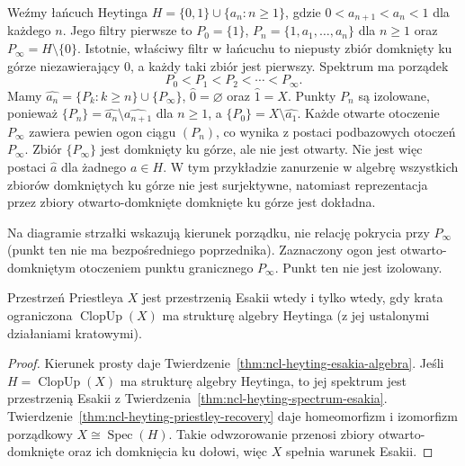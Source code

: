 \begin{przyklad}
\label{ex:ncl-heyting-infinite-spectrum}
Weźmy łańcuch Heytinga
$H=\{0,1\}\cup\{a_n:n\geq1\}$,
gdzie $0<a_{n+1}<a_n<1$ dla każdego $n$.
Jego filtry pierwsze to
$P_0=\{1\}$, $P_n=\{1,a_1,\ldots,a_n\}$ dla $n\geq1$
oraz $P_\infty=H\setminus\{0\}$.
Istotnie, właściwy filtr w łańcuchu to niepusty
zbiór domknięty ku górze niezawierający $0$,
a każdy taki zbiór jest pierwszy.
Spektrum ma porządek
\[
 P_0<P_1<P_2<\cdots<P_\infty.
\]
Mamy $\widehat{a_n}=\{P_k:k\geq n\}\cup\{P_\infty\}$,
$\widehat0=\varnothing$ oraz $\widehat1=X$.
Punkty $P_n$ są izolowane, ponieważ
$\{P_n\}=\widehat{a_n}\setminus\widehat{a_{n+1}}$
dla $n\geq1$, a $\{P_0\}=X\setminus\widehat{a_1}$.
Każde otwarte otoczenie $P_\infty$ zawiera
pewien ogon ciągu $(P_n)$, co wynika z postaci
podbazowych otoczeń $P_\infty$.
Zbiór $\{P_\infty\}$ jest domknięty ku górze,
ale nie jest otwarty. Nie jest więc postaci
$\widehat a$ dla żadnego $a\in H$.
W tym przykładzie zanurzenie w algebrę wszystkich
zbiorów domkniętych ku górze nie jest surjektywne,
natomiast reprezentacja przez zbiory
otwarto-domknięte domknięte ku górze jest dokładna.
\end{przyklad}

\begin{center}
\end{center}
Na diagramie strzałki wskazują kierunek porządku,
nie relację pokrycia przy $P_\infty$ (punkt ten
nie ma bezpośredniego poprzednika).
Zaznaczony ogon jest otwarto-domkniętym
otoczeniem punktu granicznego $P_\infty$.
Punkt ten nie jest izolowany.

\begin{wniosek}
\label{cor:ncl-heyting-esakia-characterization}
Przestrzeń Priestleya $X$ jest przestrzenią Esakii
wtedy i tylko wtedy, gdy krata ograniczona
$\operatorname{ClopUp}(X)$ ma strukturę algebry
Heytinga (z jej ustalonymi działaniami kratowymi).
\end{wniosek}
\begin{proof}
Kierunek prosty daje
Twierdzenie~\ref{thm:ncl-heyting-esakia-algebra}.
Jeśli $H=\operatorname{ClopUp}(X)$ ma strukturę
algebry Heytinga, to jej spektrum jest przestrzenią
Esakii z Twierdzenia~\ref{thm:ncl-heyting-spectrum-esakia}.
Twierdzenie~\ref{thm:ncl-heyting-priestley-recovery}
daje homeomorfizm i izomorfizm porządkowy
$X\cong\operatorname{Spec}(H)$.
Takie odwzorowanie przenosi zbiory
otwarto-domknięte oraz ich domknięcia ku dołowi,
więc $X$ spełnia warunek Esakii.
\end{proof}


